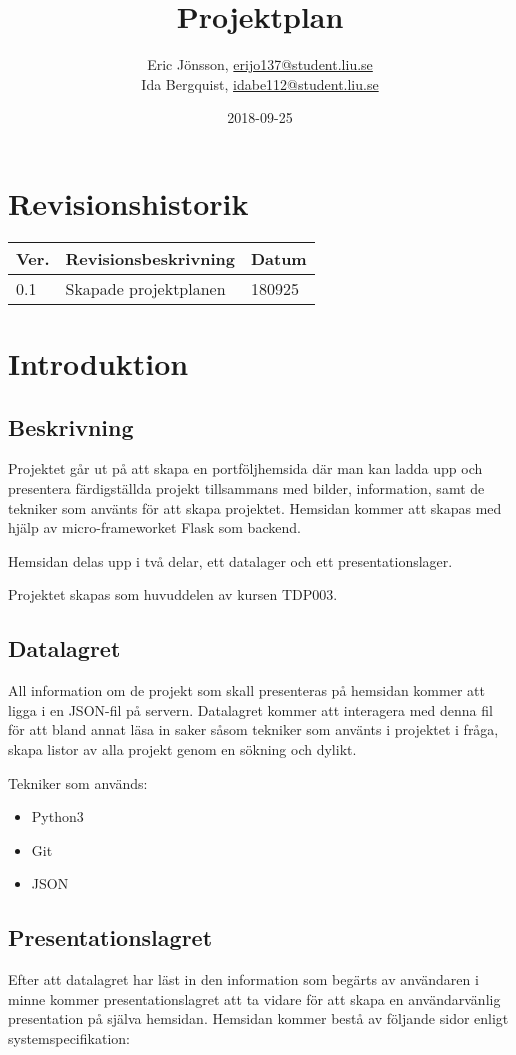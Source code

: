 \documentclass{TDP003mall}
\author{Eric Jönsson, \url{erijo137@student.liu.se}\\
  Ida Bergquist, \url{idabe112@student.liu.se}}
\title{Projektplan}
\date{2018-09-25}
\begin{document}
\projectpage
\tableofcontents
\newpage
\section{Revisionshistorik}
\begin{table}[!h]
\begin{tabularx}{\linewidth}{|l|X|l|}
\hline
\textbf{Ver.} & \textbf{Revisionsbeskrivning} & \textbf{Datum} \\\hline
0.1 & Skapade projektplanen & 180925 \\\hline
\end{tabularx}
\end{table}

\section{Introduktion}
\subsection{Beskrivning}
Projektet går ut på att skapa en portföljhemsida där man kan
ladda upp och presentera färdigställda projekt tillsammans med bilder,
information, samt de tekniker som använts för att skapa projektet. Hemsidan
kommer att skapas med hjälp av micro-frameworket Flask som backend.

Hemsidan delas upp i två delar, ett datalager och ett presentationslager.

Projektet skapas som huvuddelen av kursen TDP003.

\subsection{Datalagret}
All information om de projekt som skall presenteras på hemsidan kommer
att ligga i en JSON-fil på servern. Datalagret kommer att interagera
med denna fil för att bland annat läsa in saker såsom tekniker som använts
i projektet i fråga, skapa listor av alla projekt genom en sökning och
dylikt.

Tekniker som används:
\begin{itemize}
\item Python3
\item Git
\item JSON
\end{itemize}

\subsection{Presentationslagret}
Efter att datalagret har läst in den information som begärts av användaren
i minne kommer presentationslagret att ta vidare för att skapa en
användarvänlig presentation på själva hemsidan. Hemsidan kommer bestå av
följande sidor enligt systemspecifikation:
\end{document}
